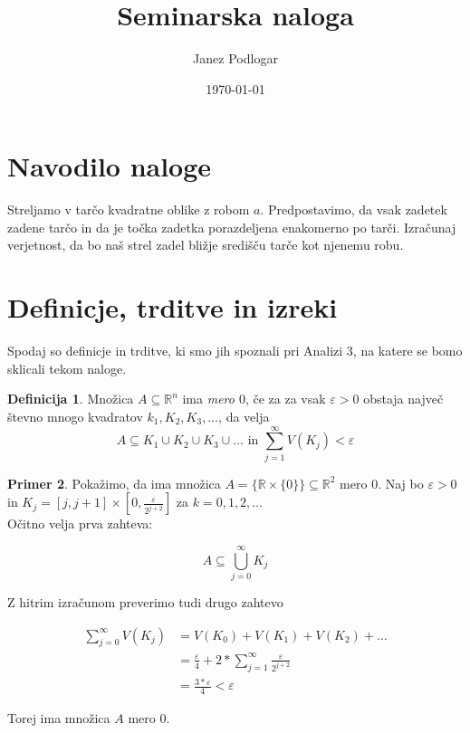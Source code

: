 \documentclass{amsart}
\title{Seminarska naloga}
\author{Janez Podlogar}
\date{\today}
\newcommand{\R}{\mathbb{R}}
\theoremstyle{definition} %
\newtheorem{definicija}{Definicija}[section]
\newtheorem{primer}[definicija]{Primer}
\theoremstyle{plain} %
\begin{document}
\maketitle
\section{Navodilo naloge}
Streljamo v tarčo kvadratne oblike z robom $a$. Predpostavimo, da vsak zadetek zadene
tarčo in da je točka zadetka porazdeljena enakomerno po tarči. Izračunaj verjetnost, da
bo naš strel zadel bližje središču tarče kot njenemu robu.

\section{Definicje, trditve in izreki}

Spodaj so definicje in trditve, ki smo jih spoznali pri Analizi 3, na katere se bomo sklicali tekom naloge.

\begin{definicija}\label{def}
Množica $ A \subseteq \R^n $ ima \emph{mero $0$}, če za za vsak $\varepsilon > 0$ obstaja največ števno mnogo
kvadratov $k_1,K_2,K_3,\ldots$, da velja
\begin{equation*}
    A \subseteq K_1 \cup K_2 \cup K_3 \cup \ldots \text{ in } \sum_{j = 1}^{\infty} V(K_j) < \varepsilon
\end{equation*}
\end{definicija}

\begin{primer}\label{pri}
Pokažimo, da ima množica $A = \{ \R \times \{0\} \} \subseteq \R^2$ mero $0$.
Naj bo $ \varepsilon > 0 $ in $ K_j = \left[j,j+1\right] \times \left[0,\frac{\varepsilon}{2^{j+2}}\right] $ 
za $ k = 0,1,2,\ldots $ \\

Očitno velja prva zahteva:

\begin{equation*}
    A \subseteq \bigcup_{j=0}^{\infty} K_{j}
\end{equation*}

Z hitrim izračunom preverimo tudi drugo zahtevo

\begin{align*}
    \sum_{j = 0}^{\infty} V(K_j) 
    &= V(K_0) + V(K_1) + V(K_2) + \ldots \\
    &= \frac{\varepsilon}{4} + 2 * \sum_{j = 1}^{\infty} \frac{\varepsilon}{2^{j+2}} \\
    &= \frac{3*\varepsilon}{4} < \varepsilon
\end{align*}

Torej ima množica $A$ mero $0$.

\end{primer}
\end{document}
